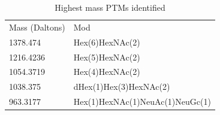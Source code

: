 \documentclass[journal=jprobs,manuscript=article]{achemso}
\begin{document}
\begin{table}[]
\centering
\caption{Highest mass PTMs identified}
\label{tab:table3}
\begin{tabular}{ll}
Mass (Daltons)&	Mod\\
1378.474&	Hex(6)HexNAc(2)\\
1216.4236&	Hex(5)HexNAc(2)\\
1054.3719&	Hex(4)HexNAc(2)\\
1038.375&	dHex(1)Hex(3)HexNAc(2)\\
963.3177&	Hex(1)HexNAc(1)NeuAc(1)NeuGc(1)
\end{tabular}
\end{table}








\end{document}
